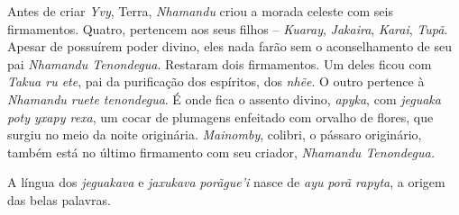 Antes de criar \emph{Yvy}, Terra, \emph{Nhamandu} criou a morada celeste
com seis firmamentos. Quatro, pertencem aos seus filhos --
\emph{Kuaray}, \emph{Jakaira}, \emph{Karai}, \emph{Tupã}. Apesar de
possuírem poder divino, eles nada farão sem o aconselhamento de seu pai
\emph{Nhamandu Tenondegua}. Restaram dois firmamentos. Um deles ficou
com \emph{Takua ru ete}, pai da purificação dos espíritos, dos
\emph{nhẽe}. O outro pertence à \emph{Nhamandu ruete tenondegua}. É onde
fica o assento divino, \emph{apyka}, com \emph{jeguaka poty yxapy rexa},
um cocar de plumagens enfeitado com orvalho de flores, que surgiu no
meio da noite originária. \emph{Mainomby}, colibri, o pássaro
originário, também está no último firmamento com seu criador,
\emph{Nhamandu Tenondegua.} 

A língua dos \emph{jeguakava} e \emph{jaxukava} \emph{porãgue'i} nasce
de \emph{ayu} \emph{porã rapyta}, a origem das belas palavras.


 
